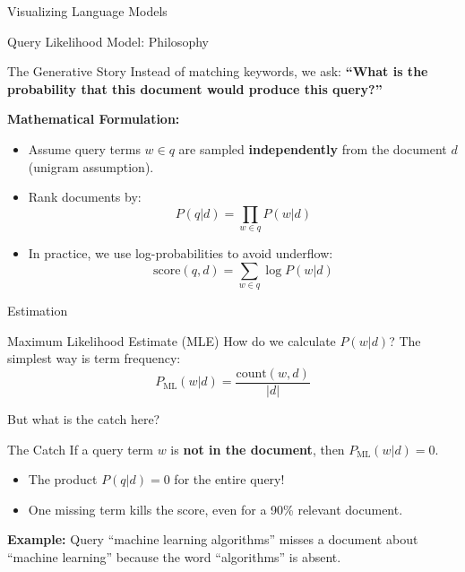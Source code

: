 \documentclass[aspectratio=169]{beamer}
\newif\ifanimated
\newcommand{\cpause}{\ifanimated\pause\fi}
\begin{document}
\begin{frame}{Visualizing Language Models}
\begin{center}

\end{center}
\end{frame}


\begin{frame}[shrink=12]{Query Likelihood Model: Philosophy}
\begin{block}{The Generative Story}
Instead of matching keywords, we ask: \textbf{``What is the probability that this document would produce this query?''}
\end{block}
\cpause
\vspace{1em}

\textbf{Mathematical Formulation:}
\begin{itemize}
    \item Assume query terms $w \in q$ are sampled \textbf{independently} from the document $d$ (unigram assumption).
    \cpause
    \item Rank documents by:
    $$P(q|d) = \prod_{w \in q} P(w|d)$$
    \cpause
    \item In practice, we use log-probabilities to avoid underflow:
    $$\text{score}(q,d) = \sum_{w \in q} \log P(w|d)$$
\end{itemize}
\end{frame}

\begin{frame}[shrink=12]{Estimation}
\begin{block}{Maximum Likelihood Estimate (MLE)}
How do we calculate $P(w|d)$? The simplest way is term frequency:
$$P_{\text{ML}}(w|d) = \frac{\text{count}(w,d)}{|d|}$$
\end{block}

But what is the catch here?
\cpause
\vspace{0.5em}

\begin{alertblock}{The Catch}
If a query term $w$ is \textbf{not in the document}, then $P_{\text{ML}}(w|d) = 0$.
\begin{itemize}
    \item The product $P(q|d) = 0$ for the entire query!
    \item One missing term kills the score, even for a 90\% relevant document.
\end{itemize}\cpause
\end{alertblock}

\vspace{0.5em}

\textbf{Example:} Query ``machine learning algorithms'' misses a document about ``machine learning'' because the word ``algorithms'' is absent.
\end{frame}
\end{document}
